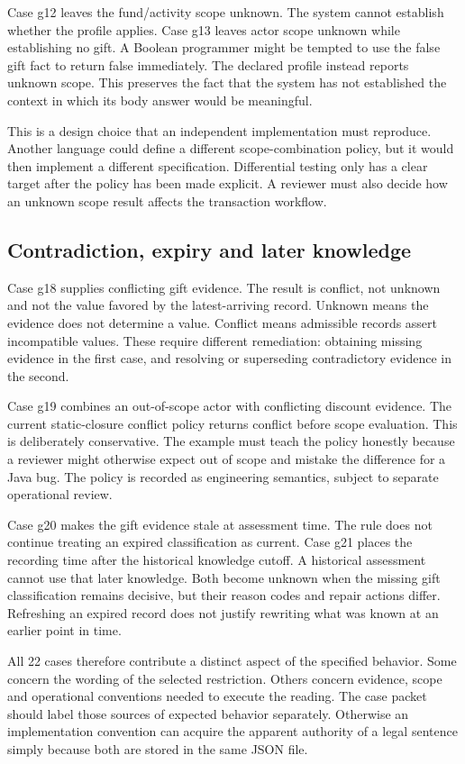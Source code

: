 Case g12 leaves the fund/activity scope unknown. The system cannot establish
whether the profile applies. Case g13 leaves actor scope unknown while
establishing no gift. A Boolean programmer might be tempted to use the false
gift fact to return false immediately. The declared profile instead reports
unknown scope. This preserves the fact that the system has not established the
context in which its body answer would be meaningful.

This is a design choice that an independent implementation must reproduce.
Another language could define a different scope-combination policy, but it
would then implement a different specification. Differential testing only has
a clear target after the policy has been made explicit. A reviewer must also
decide how an unknown scope result affects the transaction workflow.

\subsection{Contradiction, expiry and later knowledge}
Case g18 supplies conflicting gift evidence. The result is conflict, not
unknown and not the value favored by the latest-arriving record. Unknown means
the evidence does not determine a value. Conflict means admissible records
assert incompatible values. These require different remediation: obtaining
missing evidence in the first case, and resolving or superseding contradictory
evidence in the second.

Case g19 combines an out-of-scope actor with conflicting discount evidence.
The current static-closure conflict policy returns conflict before scope
evaluation. This is deliberately conservative. The example must teach the
policy honestly because a reviewer might otherwise expect out of scope and
mistake the difference for a Java bug. The policy is recorded as engineering
semantics, subject to separate operational review.

Case g20 makes the gift evidence stale at assessment time. The rule does not
continue treating an expired classification as current. Case g21 places the
recording time after the historical knowledge cutoff. A historical assessment
cannot use that later knowledge. Both become unknown when the missing gift
classification remains decisive, but their reason codes and repair actions
differ. Refreshing an expired record does not justify rewriting what was known
at an earlier point in time.

All 22 cases therefore contribute a distinct aspect of the specified behavior.
Some concern the wording of the selected restriction. Others concern evidence,
scope and operational conventions needed to execute the reading. The case
packet should label those sources of expected behavior separately. Otherwise
an implementation convention can acquire the apparent authority of a legal
sentence simply because both are stored in the same JSON file.

